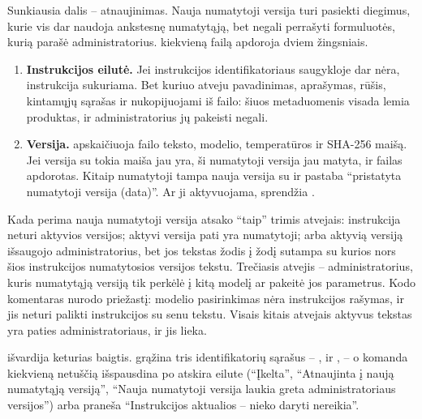 Sunkiausia dalis -- atnaujinimas. Nauja numatytoji versija turi pasiekti diegimus, kurie vis dar
naudoja ankstesnę numatytąją, bet negali perrašyti formuluotės, kurią parašė administratorius.
 kiekvieną failą apdoroja dviem žingsniais.

\begin{enumerate}
  \item \textbf{Instrukcijos eilutė.} Jei instrukcijos identifikatoriaus saugykloje dar nėra,
    instrukcija sukuriama. Bet kuriuo atveju pavadinimas, aprašymas, rūšis, kintamųjų sąrašas ir
     nukopijuojami iš failo: šiuos metaduomenis visada lemia produktas, ir
    administratorius jų pakeisti negali.
  \item \textbf{Versija.}  apskaičiuoja failo teksto, modelio, temperatūros
    ir  SHA-256 maišą. Jei versija su tokia maiša jau yra, ši numatytoji
    versija jau matyta, ir failas apdorotas. Kitaip numatytoji tampa nauja versija su
      ir pastaba \enquote{pristatyta numatytoji versija (data)}. Ar ji
    aktyvuojama, sprendžia .
\end{enumerate}

\begin{codebox}{Kada perima nauja numatytoji versija}
 atsako \enquote{taip} trimis atvejais: instrukcija
neturi aktyvios versijos; aktyvi versija pati yra numatytoji; arba aktyvią versiją išsaugojo
administratorius, bet jos tekstas žodis į žodį sutampa su kurios nors šios instrukcijos
numatytosios versijos tekstu. Trečiasis atvejis -- administratorius, kuris numatytąją versiją
tik perkėlė į kitą modelį ar pakeitė jos parametrus. Kodo komentaras nurodo priežastį: modelio
pasirinkimas nėra instrukcijos rašymas, ir jis neturi palikti instrukcijos su senu tekstu.
Visais kitais atvejais aktyvus tekstas yra paties administratoriaus, ir jis lieka.
\end{codebox}

 išvardija keturias baigtis.  grąžina tris
identifikatorių sąrašus -- ,  ir , -- o komanda
kiekvieną netuščią išspausdina po atskira eilute (\enquote{Įkelta}, \enquote{Atnaujinta į naują
numatytąją versiją}, \enquote{Nauja numatytoji versija laukia greta administratoriaus versijos})
arba praneša \enquote{Instrukcijos aktualios -- nieko daryti nereikia}.


